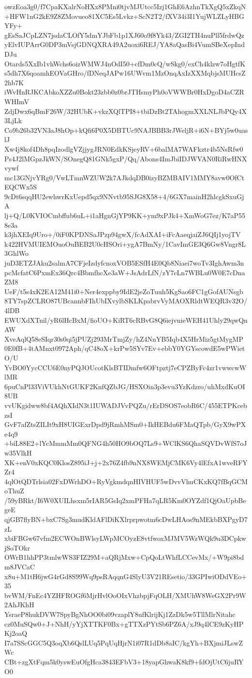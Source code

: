 owzEoa3g0/f7CpaKXalrNoHXx8PMni0tjvMJUtcc5Izj1GhE6AzhnTkXgQ5xZkqN
+HFW1nG2kE9Z8ZMovueo81XC5Es5Lvkz+ScN2T2/fXV34i3I1YujWLZLyHBGYFy+
gEsSaJCpLZN7jsdaCLOfY5dmYJbFb1p1XJ60o9f8Yk43/ZGI2TH4nuPll5frdwQz
yElvIUPArrG0DP3mVsjGDNQXRA49A2uoxi6REJ/YA8aQasBi4VumSBeXepIndDJu
Otards5XxIb1vhWchs6oizWMWJ4nOdI50+cfDm0cQ/wSkg0/exCh4klzw7oHgtfK
s5dh7X6qoamhEOVaGHro/fDNeqJAPw16UWvm1MzOnqAxIzXXMqbjsMUHcsZ2hb7K
iWvHnRJKCAbkoXZZu0Bokt23zbb0z0brJTHsmyPh0oVWWBr0HxDgoD4aCZRWHImV
ZdjDwx6qBmF26W/32HUbK+vkzXQlTPI8+tbiDzBt2TAhogmXXLNLJbPQy4X3LjLk
Co9b26b32VN3aJ8hOp+kQfi6P0X5DBTUc9NAJBBB3rJWeljR+i6N+BYj5w0uaslJ
Xw4j8kof4Dh8pqIzodlgVZjjygJRN0EdkKSjeyRV+6balMA7WAFkztr4b5NsRfw0
Ps4J2lMGpzJkWN/SOnegQ81GNk5gxP/Qq/Abons4ImJbiIDJWVAN0RiRwHNXvywf
mc13GNjvYRg0/VwLTmnWZUW2k7AJkdqDB0izyBZMBAIV1MMY8avw0OfCtEQCWx5S
9cDt6sqqHU2ewhwrKxUepd5qx9NNvtb95SJG8X58+4/6GX7mainH2hlcgkSxuGjA
lj+Q/L0KVIOCmbffub6uL+i1aHgnGjYP9KK+ym9xPJk4+XmWoG7ez/K7aP558e3a
k3jhXEIq9Uro+/0iF0KPDNSaJPzp94gwX/fcAdXAI+iFcAaeqjaiZJ6QIj1yojTV
k422HVMUIEMOuoOuBEB2U0cHSOri+ygA7BmNy/1CavImGE3Q6Gw8Vngr8L3GhlWo
juD3ETZJAku2salmA7CFjeIzdyfcnoxVOB5ESfH4E0Qb8Niaei7woTv3IghAwm3n
pcMcfatC6PxmEx36Qrc4BbmfhcXe3aW+JsAdrLfN/zY7cLn7WBLu0W0E7cDnaZM8
UeF/t5s4xK2EA12M41i0+Ner4exppby9IdE2jeZoTuuh5KgSao6FC1gGofAUNsgb
8TY7spZCLRO87UBcannbFIhUbIXvylbSKLKpabrvVyMAOXRldtWEQR3v32O/4lDB
EWUXdXTnil/yR6lHcBxM/fioUO+KiRT6cRBvG8Q6iejvnieWEH41Uhly29qwQnAW
XveAqlQ58eSIqr30s0qi5jPUZj293MrTmjZy/hZ4NnYB5Iqb4X5HrMiz5gtMygMP
0E0fB+4tAMnxt0972Aph/qC48oX+krPw5SYv7Ev+ebbY0YGYscowdE5wPWietO/U
YvBO0YycCCU6E0nyPQJOUcotKlsBTIDmfw6OFtpztj7eCPZByFc4zr1vwwcwWlMR
6puCnPl33ViVUkhNtGUKF2KnfQZbJG/HSXOin3p3evu3YzKdzro/uhMxdKuOI8UB
vvUKgidww8bf4AQhXIdN3t1IUWADJVvPQZu/rErDSOS7eobR6C/455ETPKcebzsI
GvF7afZtsZILIt9xH8UIGExrDpd9jRmhMSm0+IkHEBdu6FMaQTpb/GyX9wPXe4q9
+biL88E2+lYcMmmMm0QFNG4h50HO9bOQ7Ls9+WClKS6QhaSQVDvWfS7oJw35VlkH
XK+enV0xKQC0KlosZ895iJ+j+2x76Z4fb9nNX8WEMjCMK6Vy4lEfxA1wveRFYZr4
4qlOtQDTrlsia02FxDWrhDO+RyVgkmdqnHIVHUF5wDvvVhuCKxKQ7fBqGCMoThuZ
/59yBRkt/I6W0XUILhsxm5rIAR5GsIq2xmPFHa7qLR5Km0OYZdf1QjOaUpbBegeE
qjGB7flyBN+bxC7Sg3mudKldAFlDiKXlrprpwotm6cDwLHAos9nMEkbBXPgyD7zL
xbiFBGw67vfm2ECWOnBWlsyLWpMCOyzE8vtfwoxMJMV5WzWQk9u3DCpkwjSoTOkr
OWrB1hhPP3tmlwWS3FIZ29M+aQRjMxw+CpQoLtWhfLCCevMx/+W9pi8bdm8JVCaC
x8u+M1tH6jwG4rGd8S99Wq9psRAqqnG4SlyU3V21REsetio/33GPIwiODdVEo+35
bvWM/FnEc4YZHFROGf6MjrHvlOoOIxVhzbpjFqOLH/XMUhW8WeGX2Pr9W2AhJKhH
YsraeP8hukDVW7SpyBgNhOO0bi09vzaplY8ufKlrijKj1ZzDk5w5TllMlrNitahc
cz0MuSQw0+J+NhH/yYjXTTKF0Bx+gTTXzPYtSb6PZ6A/xJ9q4lCE9zKyHPKj2oaQ
I7a7SScGGC5Q3oqXb6QslLUq5PqUqHjrN1i07R1dDb8aIC/kgYh+BXjmiJLswZWc
CBt+zgXtFqm5k0yswEuOfgHca3843EFbV3+18yapGhwaK8kf9+fdOjUtC6juRYO0
